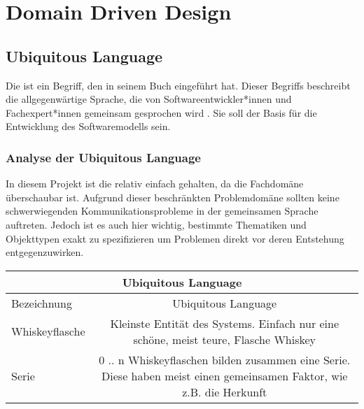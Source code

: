
\chapter{Domain Driven Design}
	

	\section{Ubiquitous Language}
	Die  ist ein Begriff, den \citeauthor{evans2004ddd} in seinem Buch  eingeführt hat. Dieser Begriffs beschreibt die allgegenwärtige Sprache, die von Softwareentwickler*innen und Fachexpert*innen gemeinsam gesprochen wird \cite{ubiquitousLanguage.entwicklerDE}. Sie soll der Basis für die Entwicklung des Softwaremodells sein.
	
		\subsection{Analyse der Ubiquitous Language}
		In diesem Projekt ist die  relativ einfach gehalten, da die Fachdomäne überschaubar ist. Aufgrund dieser beschränkten Problemdomäne sollten keine schwerwiegenden Kommunikationsprobleme in der gemeinsamen Sprache auftreten. Jedoch ist es auch hier wichtig, bestimmte Thematiken und Objekttypen exakt zu spezifizieren um Problemen direkt vor deren Entstehung entgegenzuwirken.
		
		\begin{table}[ht]
			\begin{adjustbox}{width=1\textwidth}
				\begin{tabular}{|l|c|}
					\hline
					\multicolumn{2}{|c|}{Ubiquitous Language} \\
					\hline
					\hk{normale} Bezeichnung 		&		Ubiquitous Language \\
					\hline
					Whiskeyflasche				&		Kleinste Entität des Systems. Einfach nur eine schöne, meist teure, Flasche Whiskey \\
					\hline
					Serie						&		0 .. n Whiskeyflaschen bilden zusammen eine Serie. Diese haben meist einen gemeinsamen Faktor, wie z.B. die Herkunft \\
					\hline
				\end{tabular}
			\end{adjustbox}
		\end{table}
	
